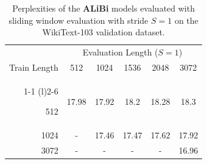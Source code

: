 \begin{table}[t]
\caption{Perplexities of the \textbf{ALiBi} models evaluated with sliding window evaluation with stride $S=1$ on the WikiText-103 validation dataset.}
\label{tab:lab_extrapolating_cw}
\begin{center}
\begin{tabular}{@{}rccccc@{}}
\toprule
                               &  \multicolumn{5}{c}{Evaluation Length ($S=1$)} \\  
               Train Length               & 512 & 1024 & 1536 & 2048 & 3072 \\\cmidrule(r){1-1} \cmidrule(l){2-6}

512& 17.98 & 17.92 & 18.2 & 18.28 & 18.3 \\
 1024 &-& 17.46 & 17.47 & 17.62 & 17.92  \\
3072 & -&- & -& -& 16.96\\ \bottomrule
\end{tabular}
\end{center}
\end{table}


